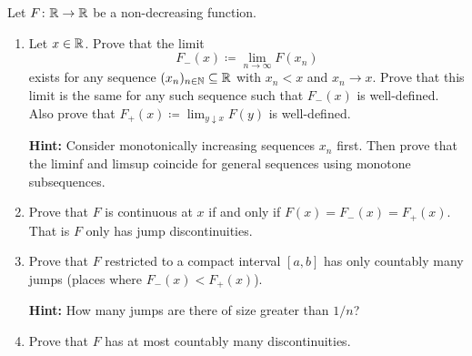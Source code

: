 \begin{exercise}[subtitle={Monotone functions have countable discontinuities \Coffeecup\Coffeecup\Coffeecup}]
    \label{ex: monotone functions have countably many discontinuities}
    Let \(F\colon \mathbb{R} \to \mathbb{R}\) be a non-decreasing function.
    \begin{enumerate}[label=(\alph*), noitemsep]
        \item\label{it: (monotone functions) left and right limits}
        Let \(x\in \mathbb{R}\). Prove that the limit
        \[
            F_-(x) \coloneq \lim_{n\to \infty} F(x_n)
        \]
        exists for any sequence \((x_n)_{n\in \mathbb{N}} \subseteq \mathbb{R}\) with \(x_n < x\)
        and \(x_n \to x\). Prove that this limit is the same for any such
        sequence such that \(F_-(x)\) is well-defined.
        Also prove that \(F_+(x) \coloneq \lim_{y\downarrow x} F(y)\) is
        well-defined.

        \textbf{Hint:} Consider monotonically increasing sequences \(x_n\) first.
        Then prove that the liminf and limsup coincide for general sequences
        using monotone subsequences.

        \item\label{it: F continuous if and only if all coincide}
        Prove that \(F\) is continuous at \(x\) if and only
        if \(F(x) = F_-(x) = F_+(x)\). That is
        \(F\) only has jump discontinuities.

        \item\label{it: (monotone functions) countable jumps, compact interval}
        Prove that \(F\) restricted to a compact interval \([a,b]\)
        has only countably many jumps (places where \(F_-(x) < F_+(x)\)).

        \textbf{Hint:} How many jumps are there of size greater than \(1/n\)?

        \item\label{it: (monotone functions) countable jumps, real line}
        Prove that \(F\) has at most countably many discontinuities.
    \end{enumerate}
\end{exercise}

